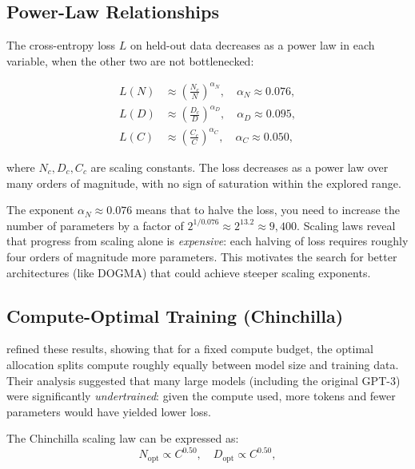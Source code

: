 \subsection{Power-Law Relationships}

The cross-entropy loss $L$ on held-out data decreases as a power law in each variable, when the other two are not bottlenecked:

\begin{align}
L(N) &\approx \left(\frac{N_c}{N}\right)^{\alpha_N}, \quad \alpha_N \approx 0.076, \label{eq:scaling-N} \\
L(D) &\approx \left(\frac{D_c}{D}\right)^{\alpha_D}, \quad \alpha_D \approx 0.095, \label{eq:scaling-D} \\
L(C) &\approx \left(\frac{C_c}{C}\right)^{\alpha_C}, \quad \alpha_C \approx 0.050, \label{eq:scaling-C}
\end{align}

where $N_c, D_c, C_c$ are scaling constants. The loss decreases as a power law over many orders of magnitude, with no sign of saturation within the explored range.

\begin{example}
The exponent $\alpha_N \approx 0.076$ means that to halve the loss, you need to increase the number of parameters by a factor of $2^{1/0.076} \approx 2^{13.2} \approx 9{,}400$. Scaling laws reveal that progress from scaling alone is \emph{expensive}: each halving of loss requires roughly four orders of magnitude more parameters. This motivates the search for better architectures (like DOGMA) that could achieve steeper scaling exponents.
\end{example}

\subsection{Compute-Optimal Training (Chinchilla)}

\citet{hoffmann2022} refined these results, showing that for a fixed compute budget, the optimal allocation splits compute roughly equally between model size and training data. Their analysis suggested that many large models (including the original GPT-3) were significantly \emph{undertrained}: given the compute used, more tokens and fewer parameters would have yielded lower loss.

The Chinchilla scaling law can be expressed as:
\begin{equation}
N_{\text{opt}} \propto C^{0.50}, \quad D_{\text{opt}} \propto C^{0.50},
\label{eq:chinchilla}
\end{equation}

